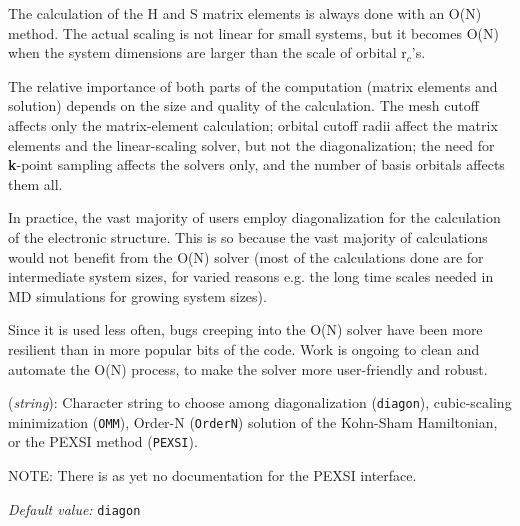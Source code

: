 \documentclass[11pt]{article}
\begin{document}
The calculation of the H and S matrix elements is always done with an
O(N) method. The actual scaling is not linear for small systems, but
it becomes O(N) when the system dimensions are larger than the scale
of orbital r$_c$'s.

The relative importance of both parts of the computation (matrix
elements and solution) depends on the size and quality of the
calculation. The mesh cutoff affects only the matrix-element
calculation; orbital cutoff radii affect the matrix elements and the
linear-scaling solver, but not the diagonalization; the need for {\bf
  k}-point sampling affects the solvers only, and the number of basis
orbitals affects them all.

In practice, the vast majority of users employ diagonalization for the
calculation of the electronic structure. This is so because the vast
majority of calculations would not benefit from the O(N) solver (most
of the calculations done are for intermediate system sizes, for varied
reasons e.g.  the long time scales needed in MD simulations for
growing system sizes).

Since it is used less often, bugs creeping into the O(N) solver have
been more resilient than in more popular bits of the code.  Work is
ongoing to clean and automate the O(N) process, to make the solver
more user-friendly and robust.


\begin{description}
\itemsep 10pt
\parsep 0pt

\item[{\bf SolutionMethod}] ({\it string}):
Character string to choose among
diagonalization ({\tt diagon}), cubic-scaling minimization ({\tt OMM}),
Order-N ({\tt OrderN}) solution of the Kohn-Sham Hamiltonian, or the
PEXSI method ({\tt PEXSI}).

NOTE: There is as yet no documentation for the PEXSI interface.

{\it Default value:} {\tt diagon}



\end{description}
\end{document}
